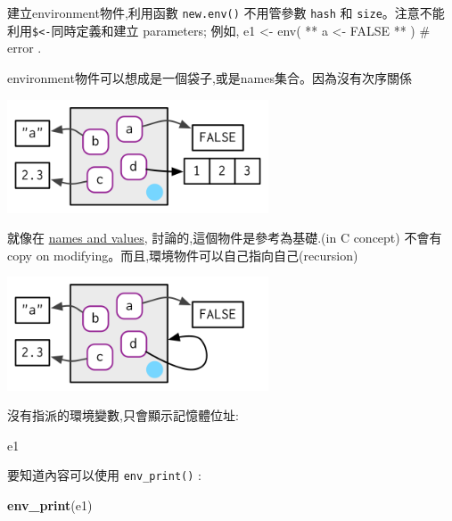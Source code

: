 \documentclass[]{book}
\newenvironment{Shaded}{\begin{snugshade}}{\end{snugshade}}
\newcommand{\KeywordTok}[1]{\textcolor[rgb]{0.13,0.29,0.53}{\textbf{#1}}}
\newcommand{\NormalTok}[1]{#1}
\newcommand{\OperatorTok}[1]{\textcolor[rgb]{0.81,0.36,0.00}{\textbf{#1}}}
\newcommand{\StringTok}[1]{\textcolor[rgb]{0.31,0.60,0.02}{#1}}
\theoremstyle{definition}
\theoremstyle{definition}
\theoremstyle{definition}
\theoremstyle{remark}
\begin{document}
建立environment物件,利用函數 \texttt{new.env()} 不用管參數 \texttt{hash}
和 \texttt{size}。注意不能利用\texttt{\$\textless{}-}同時定義和建立
parameters; 例如, e1 \textless{}- env( ** a \textless{}- FALSE ** ) \#
error .

environment物件可以想成是一個袋子,或是names集合。因為沒有次序關係

\begin{center}\includegraphics[width=3.05in]{diagrams/environments/bindings} \end{center}

就像在 \protect\hyperlink{env-modify}{names and values},
討論的,這個物件是參考為基礎.(in C concept) 不會有copy on
modifying。而且,環境物件可以自己指向自己(recursion)

\begin{Shaded}
\end{Shaded}

\begin{center}\includegraphics[width=3.05in]{diagrams/environments/loop} \end{center}

沒有指派的環境變數,只會顯示記憶體位址:

\begin{Shaded}
\begin{Highlighting}[]
\NormalTok{e1}
\end{Highlighting}
\end{Shaded}

要知道內容可以使用 \texttt{env\_print()} :

\begin{Shaded}
\begin{Highlighting}[]
\KeywordTok{env_print}\NormalTok{(e1)}
\end{Highlighting}
\end{Shaded}
\end{document}
